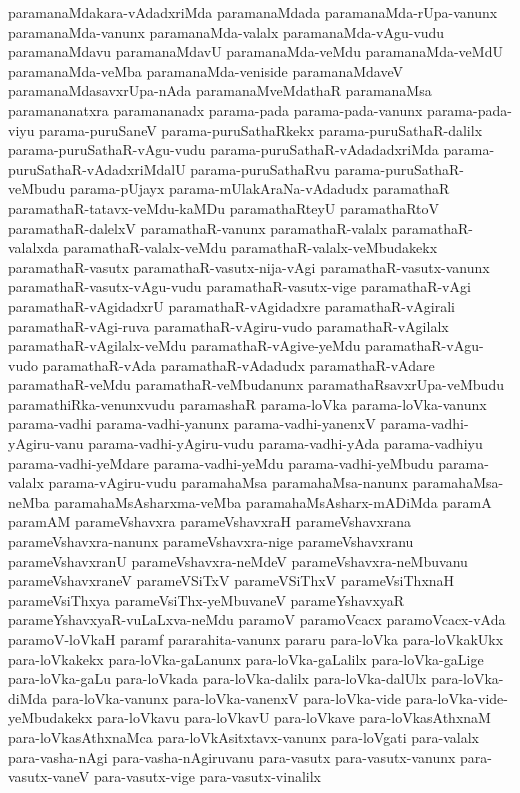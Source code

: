 {paramanaMdakara-vAdadxriMda
paramanaMdada
paramanaMda-rUpa-vanunx
paramanaMda-vanunx
paramanaMda-valalx
paramanaMda-vAgu-vudu
paramanaMdavu
paramanaMdavU
paramanaMda-veMdu
paramanaMda-veMdU
paramanaMda-veMba
paramanaMda-veniside
paramanaMdaveV
paramanaMdasavxrUpa-nAda
paramanaMveMdathaR
paramanaMsa
paramananatxra
paramananadx
parama-pada
parama-pada-vanunx
parama-pada-viyu
parama-puruSaneV
parama-puruSathaRkekx
parama-puruSathaR-dalilx
parama-puruSathaR-vAgu-vudu
parama-puruSathaR-vAdadadxriMda
parama-puruSathaR-vAdadxriMdalU
parama-puruSathaRvu
parama-puruSathaR-veMbudu
parama-pUjayx
parama-mUlakAraNa-vAdadudx
paramathaR
paramathaR-tatavx-veMdu-kaMDu
paramathaRteyU
paramathaRtoV
paramathaR-dalelxV
paramathaR-vanunx
paramathaR-valalx
paramathaR-valalxda
paramathaR-valalx-veMdu
paramathaR-valalx-veMbudakekx
paramathaR-vasutx
paramathaR-vasutx-nija-vAgi
paramathaR-vasutx-vanunx
paramathaR-vasutx-vAgu-vudu
paramathaR-vasutx-vige
paramathaR-vAgi
paramathaR-vAgidadxrU
paramathaR-vAgidadxre
paramathaR-vAgirali
paramathaR-vAgi-ruva
paramathaR-vAgiru-vudo
paramathaR-vAgilalx
paramathaR-vAgilalx-veMdu
paramathaR-vAgive-yeMdu
paramathaR-vAgu-vudo
paramathaR-vAda
paramathaR-vAdadudx
paramathaR-vAdare
paramathaR-veMdu
paramathaR-veMbudanunx
paramathaRsavxrUpa-veMbudu
paramathiRka-venunxvudu
paramashaR
parama-loVka
parama-loVka-vanunx
parama-vadhi
parama-vadhi-yanunx
parama-vadhi-yanenxV
parama-vadhi-yAgiru-vanu
parama-vadhi-yAgiru-vudu
parama-vadhi-yAda
parama-vadhiyu
parama-vadhi-yeMdare
parama-vadhi-yeMdu
parama-vadhi-yeMbudu
parama-valalx
parama-vAgiru-vudu
paramahaMsa
paramahaMsa-nanunx
paramahaMsa-neMba
paramahaMsAsharxma-veMba
paramahaMsAsharx-mADiMda
paramA
paramAM
parameVshavxra
parameVshavxraH
parameVshavxrana
parameVshavxra-nanunx
parameVshavxra-nige
parameVshavxranu
parameVshavxranU
parameVshavxra-neMdeV
parameVshavxra-neMbuvanu
parameVshavxraneV
parameVSiTxV
parameVSiThxV
parameVsiThxnaH
parameVsiThxya
parameVsiThx-yeMbuvaneV
parameYshavxyaR
parameYshavxyaR-vuLaLxva-neMdu
paramoV
paramoVcacx
paramoVcacx-vAda
paramoV-loVkaH
paramf
pararahita-vanunx
pararu
para-loVka
para-loVkakUkx
para-loVkakekx
para-loVka-gaLanunx
para-loVka-gaLalilx
para-loVka-gaLige
para-loVka-gaLu
para-loVkada
para-loVka-dalilx
para-loVka-dalUlx
para-loVka-diMda
para-loVka-vanunx
para-loVka-vanenxV
para-loVka-vide
para-loVka-vide-yeMbudakekx
para-loVkavu
para-loVkavU
para-loVkave
para-loVkasAthxnaM
para-loVkasAthxnaMca
para-loVkAsitxtavx-vanunx
para-loVgati
para-valalx
para-vasha-nAgi
para-vasha-nAgiruvanu
para-vasutx
para-vasutx-vanunx
para-vasutx-vaneV
para-vasutx-vige
para-vasutx-vinalilx
}
